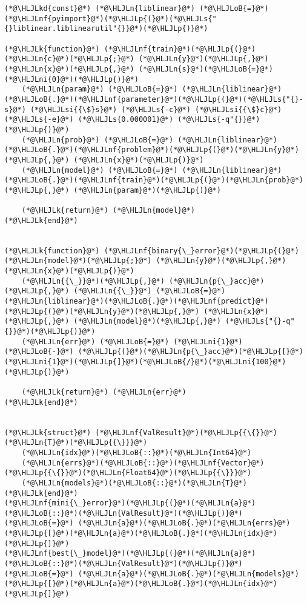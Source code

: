 \documentclass[12pt,a4paper]{article}
\newcommand{\HLJLk}[1]{\textcolor[RGB]{148,91,176}{\textbf{#1}}}
\newcommand{\HLJLkd}[1]{\textcolor[RGB]{214,102,97}{\textit{#1}}}
\newcommand{\HLJLn}[1]{#1}
\newcommand{\HLJLnf}[1]{\textcolor[RGB]{66,102,213}{#1}}
\newcommand{\HLJLs}[1]{\textcolor[RGB]{201,61,57}{#1}}
\newcommand{\HLJLsi}[1]{#1}
\newcommand{\HLJLni}[1]{\textcolor[RGB]{59,151,46}{#1}}
\newcommand{\HLJLoB}[1]{\textcolor[RGB]{102,102,102}{\textbf{#1}}}
\newcommand{\HLJLp}[1]{#1}
\begin{document}
\begin{lstlisting}
(*@\HLJLkd{const}@*) (*@\HLJLn{liblinear}@*) (*@\HLJLoB{=}@*) (*@\HLJLnf{pyimport}@*)(*@\HLJLp{(}@*)(*@\HLJLs{"{}liblinear.liblinearutil"{}}@*)(*@\HLJLp{)}@*)

(*@\HLJLk{function}@*) (*@\HLJLnf{train}@*)(*@\HLJLp{(}@*)(*@\HLJLn{c}@*)(*@\HLJLp{;}@*) (*@\HLJLn{y}@*)(*@\HLJLp{,}@*) (*@\HLJLn{x}@*)(*@\HLJLp{,}@*) (*@\HLJLn{s}@*)(*@\HLJLoB{=}@*)(*@\HLJLni{0}@*)(*@\HLJLp{)}@*)
    (*@\HLJLn{param}@*) (*@\HLJLoB{=}@*) (*@\HLJLn{liblinear}@*)(*@\HLJLoB{.}@*)(*@\HLJLnf{parameter}@*)(*@\HLJLp{(}@*)(*@\HLJLs{"{}-s}@*) (*@\HLJLsi{{\$}s}@*) (*@\HLJLs{-c}@*) (*@\HLJLsi{{\$}c}@*) (*@\HLJLs{-e}@*) (*@\HLJLs{0.000001}@*) (*@\HLJLs{-q"{}}@*)(*@\HLJLp{)}@*)
    (*@\HLJLn{prob}@*) (*@\HLJLoB{=}@*) (*@\HLJLn{liblinear}@*)(*@\HLJLoB{.}@*)(*@\HLJLnf{problem}@*)(*@\HLJLp{(}@*)(*@\HLJLn{y}@*)(*@\HLJLp{,}@*) (*@\HLJLn{x}@*)(*@\HLJLp{)}@*)
    (*@\HLJLn{model}@*) (*@\HLJLoB{=}@*) (*@\HLJLn{liblinear}@*)(*@\HLJLoB{.}@*)(*@\HLJLnf{train}@*)(*@\HLJLp{(}@*)(*@\HLJLn{prob}@*)(*@\HLJLp{,}@*) (*@\HLJLn{param}@*)(*@\HLJLp{)}@*)

    (*@\HLJLk{return}@*) (*@\HLJLn{model}@*)
(*@\HLJLk{end}@*)


(*@\HLJLk{function}@*) (*@\HLJLnf{binary{\_}error}@*)(*@\HLJLp{(}@*)(*@\HLJLn{model}@*)(*@\HLJLp{;}@*) (*@\HLJLn{y}@*)(*@\HLJLp{,}@*) (*@\HLJLn{x}@*)(*@\HLJLp{)}@*)
    (*@\HLJLn{{\_}}@*)(*@\HLJLp{,}@*) (*@\HLJLn{p{\_}acc}@*)(*@\HLJLp{,}@*) (*@\HLJLn{{\_}}@*) (*@\HLJLoB{=}@*) (*@\HLJLn{liblinear}@*)(*@\HLJLoB{.}@*)(*@\HLJLnf{predict}@*)(*@\HLJLp{(}@*)(*@\HLJLn{y}@*)(*@\HLJLp{,}@*) (*@\HLJLn{x}@*)(*@\HLJLp{,}@*) (*@\HLJLn{model}@*)(*@\HLJLp{,}@*) (*@\HLJLs{"{}-q"{}}@*)(*@\HLJLp{)}@*)
    (*@\HLJLn{err}@*) (*@\HLJLoB{=}@*) (*@\HLJLni{1}@*) (*@\HLJLoB{-}@*) (*@\HLJLp{(}@*)(*@\HLJLn{p{\_}acc}@*)(*@\HLJLp{[}@*)(*@\HLJLni{1}@*)(*@\HLJLp{]}@*)(*@\HLJLoB{/}@*)(*@\HLJLni{100}@*)(*@\HLJLp{)}@*)

    (*@\HLJLk{return}@*) (*@\HLJLn{err}@*)
(*@\HLJLk{end}@*)


(*@\HLJLk{struct}@*) (*@\HLJLnf{ValResult}@*)(*@\HLJLp{{\{}}@*)(*@\HLJLn{T}@*)(*@\HLJLp{{\}}}@*)
    (*@\HLJLn{idx}@*)(*@\HLJLoB{::}@*)(*@\HLJLn{Int64}@*)
    (*@\HLJLn{errs}@*)(*@\HLJLoB{::}@*)(*@\HLJLnf{Vector}@*)(*@\HLJLp{{\{}}@*)(*@\HLJLn{Float64}@*)(*@\HLJLp{{\}}}@*)
    (*@\HLJLn{models}@*)(*@\HLJLoB{::}@*)(*@\HLJLn{T}@*)
(*@\HLJLk{end}@*)
(*@\HLJLnf{mini{\_}error}@*)(*@\HLJLp{(}@*)(*@\HLJLn{a}@*)(*@\HLJLoB{::}@*)(*@\HLJLn{ValResult}@*)(*@\HLJLp{)}@*) (*@\HLJLoB{=}@*) (*@\HLJLn{a}@*)(*@\HLJLoB{.}@*)(*@\HLJLn{errs}@*)(*@\HLJLp{[}@*)(*@\HLJLn{a}@*)(*@\HLJLoB{.}@*)(*@\HLJLn{idx}@*)(*@\HLJLp{]}@*)
(*@\HLJLnf{best{\_}model}@*)(*@\HLJLp{(}@*)(*@\HLJLn{a}@*)(*@\HLJLoB{::}@*)(*@\HLJLn{ValResult}@*)(*@\HLJLp{)}@*) (*@\HLJLoB{=}@*) (*@\HLJLn{a}@*)(*@\HLJLoB{.}@*)(*@\HLJLn{models}@*)(*@\HLJLp{[}@*)(*@\HLJLn{a}@*)(*@\HLJLoB{.}@*)(*@\HLJLn{idx}@*)(*@\HLJLp{]}@*)



\end{lstlisting}
\end{document}
